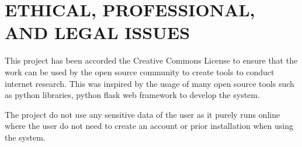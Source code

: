 \section{ETHICAL, PROFESSIONAL, AND LEGAL ISSUES}\label{sec:ethical,-professional,-and-legal-issues}
This project has been accorded the Creative Commons License to ensure that the work can be used by the open source community to create tools to conduct internet research. This was inspired by the usage of many open source tools such as python libraries, python flask web framework to develop the system. 

The project do not use any sensitive data of the user as it purely runs online where the user do not need to create an account or prior installation when using the system. 